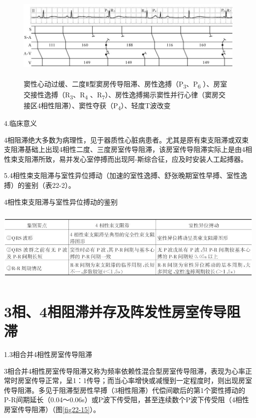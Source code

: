 \begin{figure}[!htbp]
 \centering
 \includegraphics[width=5.8125in,height=1.75in]{./images/Image00380.jpg}
 \captionsetup{justification=centering}
 \caption{窦性心动过缓、二度Ⅱ型窦房传导阻滞、房性逸搏（P\textsubscript{3}、P\textsubscript{6} ）、房室交接性逸搏（R\textsubscript{3}、R\textsubscript{4} 、R\textsubscript{7}）、房性逸搏揭示窦性并行心律（窦房交接区4相性阻滞）、窦性夺获（P\textsubscript{4}）、轻度T波改变}
 \label{fig22-14}
  \end{figure} 


4.临床意义

4相阻滞绝大多数为病理性，见于器质性心脏病患者。尤其是原有束支阻滞或双束支阻滞基础上出现4相性二度、三度房室传导阻滞，该房室传导阻滞实际上是由4相性束支阻滞所致，易并发心室停搏而出现阿-斯综合征，应及时安装人工起搏器。

5.4相性束支阻滞与室性异位搏动（加速的室性逸搏、舒张晚期室性早搏、室性逸搏）的鉴别（表22-2）。

\begin{table}[htbp]
\centering
\caption{4相性束支阻滞与室性异位搏动的鉴别}
\label{tab22-2}
\includegraphics[width=6.23958in,height=1.41667in]{./images/Image00381.jpg}
\end{table}

\protect\hypertarget{text00029.htmlux5cux23subid358}{}{}

\section{3相、4相阻滞并存及阵发性房室传导阻滞}

1.3相合并4相性房室传导阻滞

3相合并4相性房室传导阻滞又称为频率依赖性混合型房室传导阻滞，表现为心率正常时房室传导正常，呈1：1传导；而当心率增快或减慢到一定程度时，则出现房室传导阻滞。多见于阻滞型房性早搏（3相性阻滞）代偿间歇后的第1个窦性搏动的P-R间期延长（0.04～0.06s）或P波下传受阻，甚至连续数个P波下传受阻（4相性房室传导阻滞）（图\ref{fig22-15}）。


